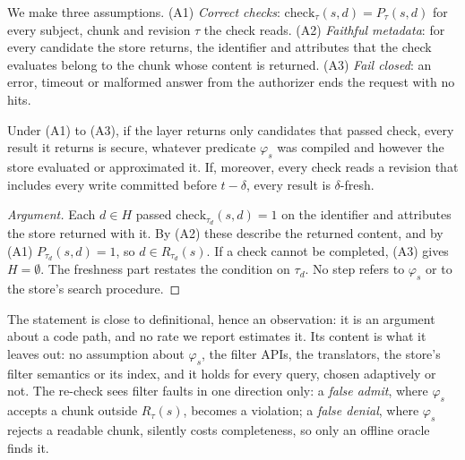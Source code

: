 We make three assumptions. (A1) \emph{Correct checks}: $\mathrm{check}_\tau(s,d) = P_\tau(s,d)$ for every
subject, chunk and revision $\tau$ the check reads. (A2) \emph{Faithful metadata}: for every candidate
the store returns, the identifier and attributes that the check evaluates belong to the chunk whose
content is returned. (A3) \emph{Fail closed}: an error, timeout or malformed answer from the authorizer
ends the request with no hits.

\begin{observation}\label{prop:reduction}
Under \textup{(A1)} to \textup{(A3)}, if the layer returns only candidates that passed
$\mathrm{check}$, every result it returns is secure, whatever predicate $\varphi_s$ was compiled and
however the store evaluated or approximated it. If, moreover, every check reads a revision that
includes every write committed before $t - \delta$, every result is $\delta$-fresh.
\end{observation}

\begin{proof}[Argument]
Each $d \in H$ passed $\mathrm{check}_{\tau_d}(s,d) = 1$ on the identifier and attributes the store
returned with it. By (A2) these describe the returned content, and by (A1) $P_{\tau_d}(s,d) = 1$, so
$d \in R_{\tau_d}(s)$. If a check cannot be completed, (A3) gives $H = \emptyset$. The freshness part
restates the condition on $\tau_d$. No step refers to $\varphi_s$ or to the store's search procedure.
\end{proof}

The statement is close to definitional, hence an observation: it is an argument about a code path, and no rate we
report estimates it. Its content is what it leaves out: no assumption
about $\varphi_s$, the filter APIs, the translators, the store's filter semantics or its index, and it holds for
every query, chosen adaptively or not. The re-check sees filter faults in one direction only: a \emph{false admit},
where $\varphi_s$ accepts a chunk outside $R_\tau(s)$, becomes a violation; a \emph{false denial}, where $\varphi_s$
rejects a readable chunk, silently costs completeness, so only an offline oracle finds it.

